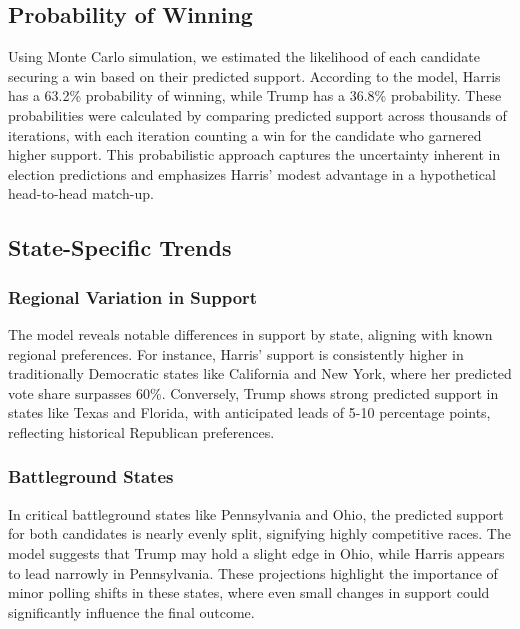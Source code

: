 \documentclass[
  letterpaper,
  DIV=11,
  numbers=noendperiod]{scrartcl}
\begin{document}
\subsection{Probability of Winning}\label{probability-of-winning}

Using Monte Carlo simulation, we estimated the likelihood of each
candidate securing a win based on their predicted support. According to
the model, Harris has a 63.2\% probability of winning, while Trump has a
36.8\% probability. These probabilities were calculated by comparing
predicted support across thousands of iterations, with each iteration
counting a win for the candidate who garnered higher support. This
probabilistic approach captures the uncertainty inherent in election
predictions and emphasizes Harris' modest advantage in a hypothetical
head-to-head match-up.

\subsection{State-Specific Trends}\label{state-specific-trends}

\subsubsection{Regional Variation in
Support}\label{regional-variation-in-support}

The model reveals notable differences in support by state, aligning with
known regional preferences. For instance, Harris' support is
consistently higher in traditionally Democratic states like California
and New York, where her predicted vote share surpasses 60\%. Conversely,
Trump shows strong predicted support in states like Texas and Florida,
with anticipated leads of 5-10 percentage points, reflecting historical
Republican preferences.

\subsubsection{Battleground States}\label{battleground-states}

In critical battleground states like Pennsylvania and Ohio, the
predicted support for both candidates is nearly evenly split, signifying
highly competitive races. The model suggests that Trump may hold a
slight edge in Ohio, while Harris appears to lead narrowly in
Pennsylvania. These projections highlight the importance of minor
polling shifts in these states, where even small changes in support
could significantly influence the final outcome.
\end{document}
